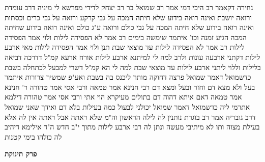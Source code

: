 \documentclass[12pt, openany]{book}
\newcommand{\chapname}{}
\newcommand{\newchap}[1]{
	\addcontentsline{toc}{chapter}{#1}
	\renewcommand{\chapname}{#1}
		\begin{center}
			\textbf{%
\fontsize{16pt}{16pt}\selectfont
				#1}
		\end{center}
}
\begin{document}
{נחירה דקאמר רב היכי  דמי אמר רב שמואל בר רב יצחק לדידי מפרשא לי מיניה דרב  עומדת ורואה יושבת ואינה רואה בידוע שלא חיתה המכה  על גבי קרקע ורואה על גבי כרים וכסתות ואינה רואה בידוע שלא חיתה המכה  על גבי כולם ורואה ע"ג כולם ואינה רואה בידוע שחיתה המכה
הגיע זמנה וכו' איתמר  שימשה בימים רב אמר  לא הפסידה לילות ולוי אמר  הפסידה לילות 
רב אמר  לא הפסידה לילות עד מוצאי שבת תנן  ולוי אמר  הפסידה לילות מאי ארבע לילות דקתני  ארבעה עונות 
ולרב למה לי למיתנא ארבע לילות  אורח ארעא קמ"ל  דדרכה דביאה בלילות  וללוי ליתני ארבע לילות עד מוצאי שבת למה לי  הא קמ"ל  דשרי למבעל לכתחלה בשבת 
כדשמואל דאמר שמואל  פרצה דחוקה מותר ליכנס בה בשבת ואע"פ שמשיר צרורות 
איתמר  בעל ולא מצא דם וחזר ובעל ומצא דם רבי חנינא אמר  טמאה ורבי אסי אמר  טהורה 
ר' חנינא אמר  טמאה דאם איתא דהוה דם בתולים מעיקרא הוי אתי  ורבי אסי אמר  טהורה דילמא אתרמי ליה כדשמואל  דאמר שמואל  יכולני לבעול כמה בעילות בלא דם  ואידך שאני שמואל דרב גובריה 
אמר רב  בוגרת נותנין לה לילה הראשון  וה"מ שלא ראתה אבל ראתה אין לה אלא בעילת מצוה ותו לא 
מיתיבי  מעשה ונתן לה רבי ארבע לילות מתוך י"ב חדש  ה"ד  אילימא דיהיב לה כולהו בימי קטנות}

\newchap{פרק  תינוקת}
\end{document}
